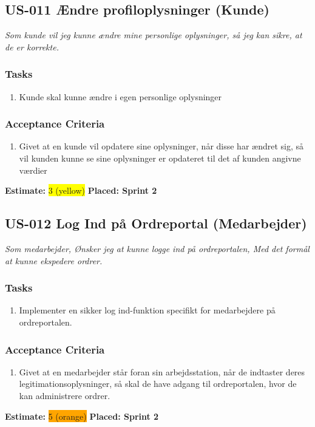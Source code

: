 \subsection{US-011 Ændre profiloplysninger (Kunde)}
\label{sec:US-011}
\textit{Som kunde vil jeg kunne ændre mine personlige oplysninger, så jeg kan sikre, at de er korrekte.}
\subsubsection*{\textbf{Tasks}}
\begin{enumerate}
  \item Kunde skal kunne ændre i egen personlige oplysninger
\end{enumerate}
\subsubsection*{\textbf{Acceptance Criteria}}
\begin{enumerate}
  \item Givet at en kunde vil opdatere sine oplysninger, når disse har ændret sig, så vil kunden kunne se sine oplysninger er opdateret til det af kunden angivne værdier
\end{enumerate}
\textbf{Estimate:} \colorbox{yellow}{3 (yellow)}
\textbf{Placed: Sprint 2}
\par\noindent\dotfill

\subsection{US-012 Log Ind på Ordreportal (Medarbejder)}
\label{sec:US-012}
\textit{Som medarbejder, Ønsker jeg at kunne logge ind på ordreportalen, Med det formål at kunne ekspedere ordrer.}
\subsubsection*{\textbf{Tasks}}
\begin{enumerate}
  \item Implementer en sikker log ind-funktion specifikt for medarbejdere på ordreportalen.
\end{enumerate}
\subsubsection*{\textbf{Acceptance Criteria}}
\begin{enumerate}
  \item Givet at en medarbejder står foran sin arbejdsstation, når de indtaster deres legitimationsoplysninger, så skal de have adgang til ordreportalen, hvor de kan administrere ordrer.
\end{enumerate}
\textbf{Estimate:} \colorbox{orange}{5 (orange)}
\textbf{Placed: Sprint 2}
\par\noindent\dotfill

